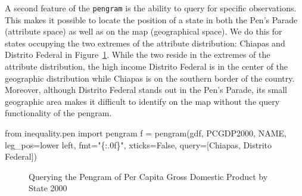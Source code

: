 \documentclass[
  a4paper, 
  twoside,
  final
]{article}
\newenvironment{Shaded}{\begin{snugshade}}{\end{snugshade}}
\newcommand{\ImportTok}[1]{\textcolor[rgb]{0.00,0.46,0.62}{#1}}
\newcommand{\NormalTok}[1]{\textcolor[rgb]{0.00,0.23,0.31}{#1}}
\newcommand{\OperatorTok}[1]{\textcolor[rgb]{0.37,0.37,0.37}{#1}}
\newcommand{\SpecialCharTok}[1]{\textcolor[rgb]{0.37,0.37,0.37}{#1}}
\newcommand{\StringTok}[1]{\textcolor[rgb]{0.13,0.47,0.30}{#1}}
\newcommand{\VariableTok}[1]{\textcolor[rgb]{0.07,0.07,0.07}{#1}}
\begin{document}
A second feature of the \texttt{pengram} is the ability to query for
specific observations. This makes it possible to locate the position of
a state in both the Pen's Parade (attribute space) as well as on the map
(geographical space). We do this for states occupying the two extremes
of the attribute distribution: Chiapas and Distrito Federal in
Figure~\ref{fig-pengramquery}. While the two reside in the extremes of
the attribute distribution, the high income Distrito Federal is in the
center of the geographic distribution while Chiapas is on the southern
border of the country. Moreover, although Distrito Federal stands out in
the Pen's Parade, its small geographic area makes it difficult to
identify on the map without the query functionality of the pengram.

\begin{Shaded}
\begin{Highlighting}[]
\ImportTok{from}\NormalTok{ inequality.pen }\ImportTok{import}\NormalTok{ pengram}
\NormalTok{f }\OperatorTok{=}\NormalTok{ pengram(gdf, }\StringTok{\textquotesingle{}PCGDP2000\textquotesingle{}}\NormalTok{, }\StringTok{\textquotesingle{}NAME\textquotesingle{}}\NormalTok{,  leg\_pos}\OperatorTok{=}\StringTok{\textquotesingle{}lower left\textquotesingle{}}\NormalTok{,}
\NormalTok{            fmt}\OperatorTok{=}\StringTok{"}\SpecialCharTok{\{:.0f\}}\StringTok{"}\NormalTok{,}
\NormalTok{            xticks}\OperatorTok{=}\VariableTok{False}\NormalTok{,}
\NormalTok{            query}\OperatorTok{=}\NormalTok{[}\StringTok{\textquotesingle{}Chiapas\textquotesingle{}}\NormalTok{, }\StringTok{\textquotesingle{}Distrito Federal\textquotesingle{}}\NormalTok{])}
\end{Highlighting}
\end{Shaded}

\begin{figure}[H]


\caption{\label{fig-pengramquery}Querying the Pengram of Per Capita
Gross Domestic Product by State 2000}

\end{figure}%
\end{document}
